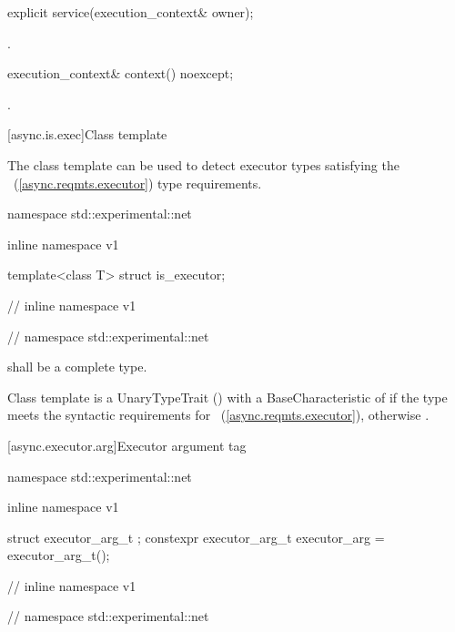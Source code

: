 %
\begin{itemdecl}
explicit service(execution_context& owner);
\end{itemdecl}

\begin{itemdescr}
\pnum
\postconditions {}.
\end{itemdescr}

%
\begin{itemdecl}
execution_context& context() noexcept;
\end{itemdecl}

\begin{itemdescr}
\pnum
\returns {}.
\end{itemdescr}



[async.is.exec]{Class template }

%
\pnum
The class template  can be used to detect executor types satisfying the ~(\ref{async.reqmts.executor}) type requirements.

\begin{codeblock}
namespace std::experimental::net {
inline namespace v1 {

  template<class T> struct is_executor;

} // inline namespace v1
} // namespace std::experimental::net
\end{codeblock}

\pnum
{} shall be a complete type.

\pnum
Class template  is a UnaryTypeTrait () with a BaseCharacteristic of  if the type  meets the syntactic requirements for ~(\ref{async.reqmts.executor}), otherwise .



[async.executor.arg]{Executor argument tag}

%
%
\begin{codeblock}
namespace std::experimental::net {
inline namespace v1 {

  struct executor_arg_t { };
  constexpr executor_arg_t executor_arg = executor_arg_t();

} // inline namespace v1
} // namespace std::experimental::net
\end{codeblock}

